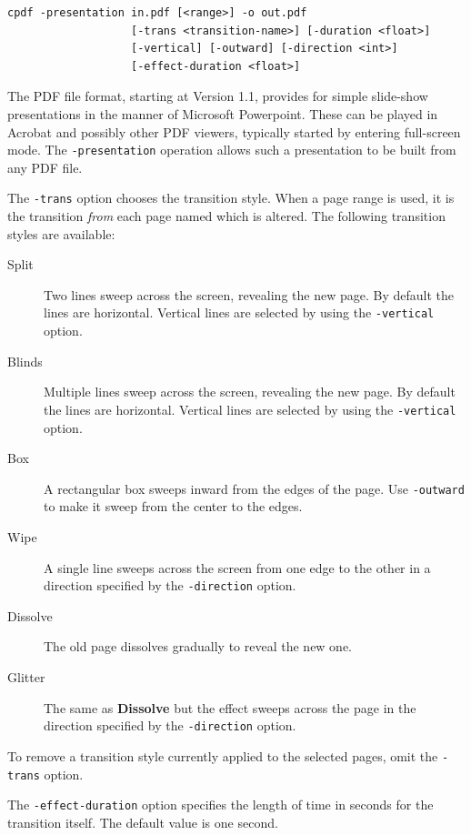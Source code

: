 \documentclass{book}
\begin{document}
  \begin{framed}
  \small\noindent\begin{verbatim}
cpdf -presentation in.pdf [<range>] -o out.pdf
                   [-trans <transition-name>] [-duration <float>]
                   [-vertical] [-outward] [-direction <int>]
                   [-effect-duration <float>]\end{verbatim}
\end{framed}

The PDF file format, starting at Version 1.1, provides for simple slide-show
presentations in the manner of Microsoft Powerpoint. These can be played in
Acrobat and possibly other PDF viewers, typically started by entering
full-screen mode. The \texttt{-presentation} operation allows such a
presentation to be built from any PDF file.

The \texttt{-trans} option chooses the transition style. When a page range is
used, it is the transition \textit{from} each page named which is altered. The
following transition styles are available:

\begin{description}
  \item[Split]Two lines sweep across the screen, revealing the new page. By
default the lines are horizontal. Vertical lines are selected by using the
\texttt{-vertical} option.
  \item[Blinds]Multiple lines sweep across the screen, revealing the new page.
By default the lines are horizontal. Vertical lines are selected by using the
\texttt{-vertical} option.
  \item[Box]A rectangular box sweeps inward from the edges of the page. Use
\texttt{-outward} to make it sweep from the center to the edges.
  \item[Wipe]A single line sweeps across the screen from one edge to the other
in a direction specified by the \texttt{-direction} option.
  \item[Dissolve]The old page dissolves gradually to reveal the new one.
  \item[Glitter]The same as \textbf{Dissolve} but the effect sweeps across the
page in the direction specified by the \texttt{-direction} option.
\end{description}

\noindent To remove a transition style currently applied to the selected pages,
omit the \texttt{-trans} option.

The \texttt{-effect-duration} option specifies the length of time in seconds
for the transition itself. The default value is one second.
\end{document}
